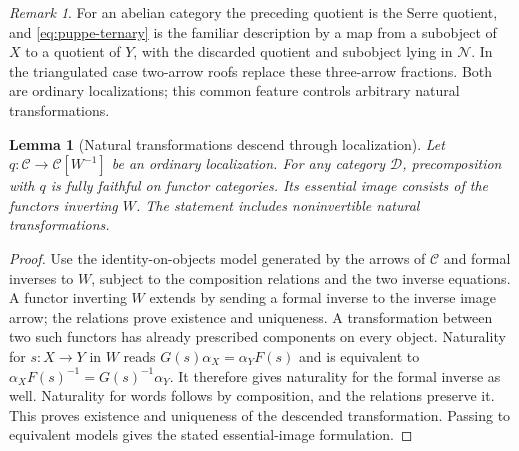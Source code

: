 \documentclass[11pt,reqno,a4paper]{amsart}
\newtheorem{lemma}[theorem]{Lemma}
\theoremstyle{definition}
\theoremstyle{remark}
\newtheorem{remark}[theorem]{Remark}
\newcommand{\C}{\mathcal{C}}
\newcommand{\D}{\mathcal{D}}
\newcommand{\N}{\mathcal{N}}
\newcommand{\0}{\mathbf{0}}
\renewcommand{\1}{\mathbf{1}}
\begin{document}
\begin{remark}\label{remternaryfractionsSerrequotient}
For an abelian category the preceding quotient is the Serre quotient,
and \eqref{eq:puppe-ternary} is the familiar description by a map from
a subobject of $X$ to a quotient of $Y$, with the discarded quotient
and subobject lying in $\N$. In the triangulated case two-arrow roofs
replace these three-arrow fractions. Both are ordinary localizations;
this common feature controls arbitrary natural transformations.
\end{remark}

\begin{lemma}[Natural transformations descend through localization]\label{lem:puppe-nat}
Let $q:\C\to\C[W^{-1}]$ be an ordinary localization.
For any category $\D$, precomposition with $q$ is fully faithful on
functor categories. Its essential image consists of the functors
inverting $W$. The statement includes noninvertible natural
transformations.
\end{lemma}
\begin{proof}
Use the identity-on-objects model generated by the arrows of $\C$
and formal inverses to $W$, subject to the composition relations and
the two inverse equations. A functor inverting $W$ extends by sending
a formal inverse to the inverse image arrow; the relations prove
existence and uniqueness. A transformation between two such functors
has already prescribed components on every object. Naturality for
$s:X\to Y$ in $W$ reads
$G(s)\alpha_X=\alpha_YF(s)$ and is equivalent to
$\alpha_XF(s)^{-1}=G(s)^{-1}\alpha_Y$.
It therefore gives naturality for the formal inverse as well.
Naturality for words follows by composition, and the relations
preserve it. This proves existence and uniqueness of the descended
transformation. Passing to equivalent models gives the stated
essential-image formulation.
\end{proof}
\end{document}
